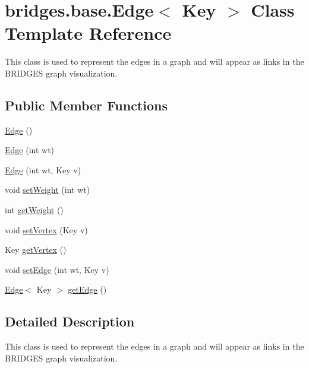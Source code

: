 \hypertarget{classbridges_1_1base_1_1_edge}{}\section{bridges.\+base.\+Edge$<$ Key $>$ Class Template Reference}
\label{classbridges_1_1base_1_1_edge}


This class is used to represent the edges in a graph and will appear as links in the B\+R\+I\+D\+G\+E\+S graph visualization.  


\subsection*{Public Member Functions}
\begin{DoxyCompactItemize}
\item 
\hyperlink{classbridges_1_1base_1_1_edge_ac070f05141bfbc7c575591e59d508476}{Edge} ()
\item 
\hyperlink{classbridges_1_1base_1_1_edge_a8567ee2a3d4d655f0a2a2258767238d6}{Edge} (int wt)
\item 
\hyperlink{classbridges_1_1base_1_1_edge_a503c093e63f5df1071233427496d9d08}{Edge} (int wt, Key v)
\item 
void \hyperlink{classbridges_1_1base_1_1_edge_a5b671fc2589d95b125b0b2cedbab0f1a}{set\+Weight} (int wt)
\item 
int \hyperlink{classbridges_1_1base_1_1_edge_a4cc9219e5842cafb7c5891ba15147ec1}{get\+Weight} ()
\item 
void \hyperlink{classbridges_1_1base_1_1_edge_a596d119b0bcfe8c455acae65832bf25d}{set\+Vertex} (Key v)
\item 
Key \hyperlink{classbridges_1_1base_1_1_edge_ada8056d4944cfea69f438af8274c1f79}{get\+Vertex} ()
\item 
void \hyperlink{classbridges_1_1base_1_1_edge_a02f0ad2a38fff319ccc8e9619f7db7f9}{set\+Edge} (int wt, Key v)
\item 
\hyperlink{classbridges_1_1base_1_1_edge}{Edge}$<$ Key $>$ \hyperlink{classbridges_1_1base_1_1_edge_a666bb076c206e572d9fca072b58db162}{get\+Edge} ()
\end{DoxyCompactItemize}


\subsection{Detailed Description}
This class is used to represent the edges in a graph and will appear as links in the B\+R\+I\+D\+G\+E\+S graph visualization. 

